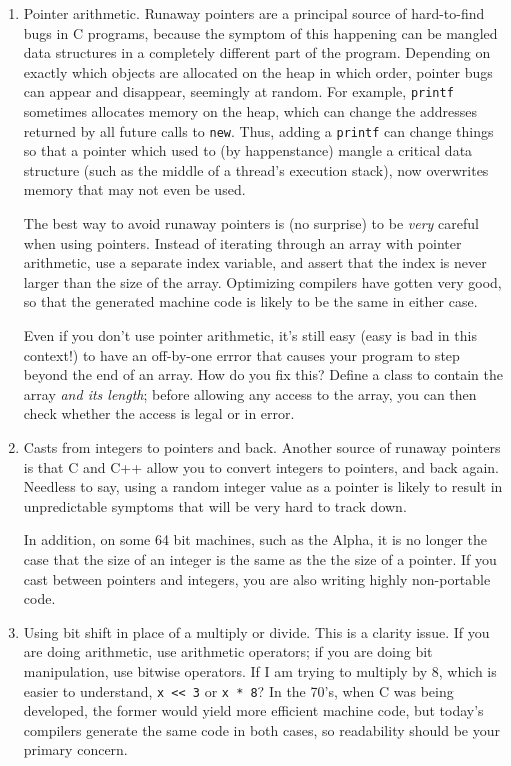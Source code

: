 \begin{enumerate}
\item Pointer arithmetic.  Runaway pointers are a principal source 
of hard-to-find bugs in C programs, because the symptom of this happening
can be mangled data structures in a completely different part of the program.
Depending on exactly which objects are allocated on the heap in which 
order, pointer bugs can appear and disappear, seemingly at random.
For example, {\tt printf} sometimes allocates memory on the heap,
which can change the addresses returned by all future calls to {\tt new}.
Thus, adding a {\tt printf} can change things so that a pointer
which used to (by happenstance) mangle a critical data structure
(such as the middle of a thread's execution stack), now overwrites memory 
that may not even be used.

The best way to avoid runaway pointers is (no surprise) to be 
{\em very} careful when using pointers.  Instead of iterating
through an array with pointer arithmetic, use a separate index  
variable, and assert that the index is never larger than the size
of the array.  Optimizing compilers have gotten very good, so that the
generated machine code is likely to be the same in either case.

Even if you don't use pointer arithmetic, it's still easy
(easy is bad in this context!) to have an off-by-one errror 
that causes your program to step beyond the end of an array.
How do you fix this?  Define a class to contain the array
{\em and its length}; before allowing any access to the array,
you can then check whether the access is legal or in error.

\item Casts from integers to pointers and back.  Another source
of runaway pointers is that C and C++ allow you to convert
integers to pointers, and back again.  Needless to say, using a 
random integer value as a pointer is likely to result in unpredictable
symptoms that will be very hard to track down.

In addition, on some 64 bit machines, such as the Alpha, it is
no longer the case that the size of an integer is the same as the
the size of a pointer.  If you cast between pointers and integers,
you are also writing highly non-portable code.

\item Using bit shift in place of a multiply or divide.
This is a clarity issue.  If you are doing arithmetic, use
arithmetic operators; if you are doing bit manipulation,
use bitwise operators.  If I am trying to multiply by 8, which is 
easier to understand, {\tt x << 3} or {\tt x * 8}?  In the 70's, 
when C was being developed, the former would yield more efficient 
machine code, but today's compilers generate the same code in both
cases, so readability should be your primary concern.


\end{enumerate}
